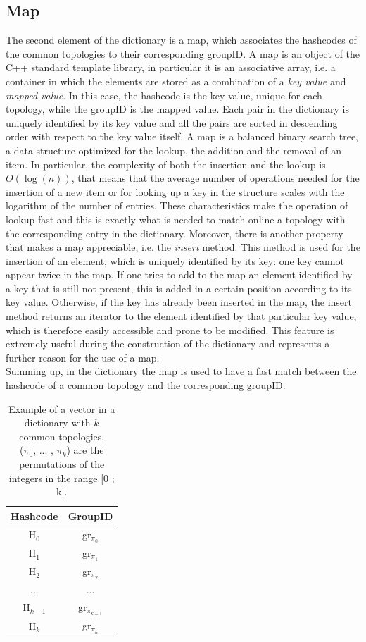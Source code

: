 \subsection{Map}
\label{sec:map}
The second element of the dictionary is a map, which associates the hashcodes of the common topologies to their corresponding groupID. A map is an object of the C++ standard template library, in particular it is an associative array, i.e. a container in which the elements are stored as a combination of a \textit{key value} and \textit{mapped value}\cite{map}. In this case, the hashcode is the key value, unique for each topology, while the groupID is the mapped value. Each pair in the dictionary is uniquely identified by its key value and all the pairs are sorted in descending order with respect to the key value itself. A map is a balanced binary search tree, a data structure optimized for the lookup, the addition and the removal of an item. In particular, the complexity of both the insertion and the lookup is $O(\log(n))$, that means that the average number of operations needed for the insertion of a new item or for looking up a key in the structure scales with the logarithm of the number of entries. These characteristics make the operation of lookup fast and this is exactly what is needed to match online a topology with the corresponding entry in the dictionary. Moreover, there is another property that makes a map appreciable, i.e. the \textit{insert} method. This method is used for the insertion of an element, which is uniquely identified by its key: one key cannot appear twice in the map. If one tries to add to the map an element identified by a key that is still not present, this is added in a certain position according to its key value. Otherwise, if the key has already been inserted in the map, the insert method returns an iterator to the element identified by that particular key value, which is therefore easily accessible and prone to be modified. This feature is extremely useful during the construction of the dictionary and represents a further reason for the use of a map.\\
Summing up, in the dictionary the map is used to have a fast match between the hashcode of a common topology and the corresponding groupID.
%
\begin{table}
\centering
\renewcommand\arraystretch{1.5}
 \begin{tabular}{|c|c|}
  \hline
  Hashcode & GroupID\\
  \hline
  H$_0$ & gr$_{\pi_{0}}$\\
  H$_1$ & gr$_{\pi_{1}}$\\
  H$_2$ & gr$_{\pi_{2}}$\\
  ... & ...\\
  H$_{k-1}$ & gr$_{\pi_{k-1}}$\\
  H$_k$ & gr$_{\pi_{k}}$\\
  \hline
 \end{tabular}
 \caption{Example of a vector in a dictionary with $k$ common topologies.\\ ($\pi_0$, ... , $\pi_k$) are the permutations of the integers in the range [0 ; k].}
 \label{tab:map}
\end{table}
%
